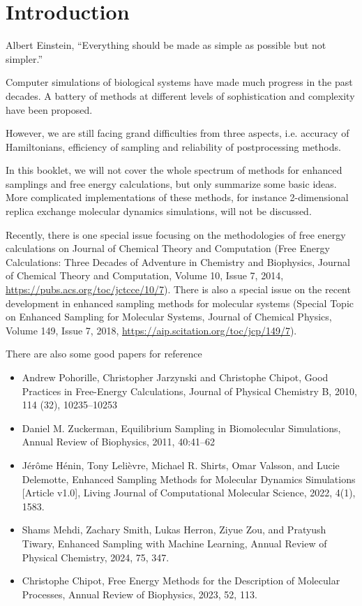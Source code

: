 \chapter{Introduction\label{chapter:introduction}}

\begin{chapquote}{Albert Einstein, %
	}
``Everything should be made as simple as possible but not simpler.''
\end{chapquote}

Computer simulations of biological systems have made much progress in the past decades. A battery of methods at different levels of sophistication and complexity have been proposed.

However, we are still facing grand difficulties from three aspects, i.e. accuracy of Hamiltonians, efficiency of sampling and reliability of postprocessing methods.\cite{NielsJCTC2014}

In this booklet, we will not cover the whole spectrum of methods for enhanced samplings and free energy calculations, but only summarize some basic ideas. 
More complicated implementations of these methods, for instance 2-dimensional replica exchange molecular dynamics simulations, will not be discussed.

Recently, there is one special issue focusing on the methodologies of free energy calculations on Journal of Chemical Theory and Computation (Free Energy Calculations: Three Decades of Adventure in Chemistry and Biophysics, Journal of Chemical Theory and Computation, Volume 10, Issue 7, 2014, \url{https://pubs.acs.org/toc/jctcce/10/7}). There is also a special issue on the recent development in enhanced sampling methods for molecular systems (Special Topic on Enhanced Sampling for Molecular Systems, Journal of Chemical Physics, Volume 149, Issue 7, 2018, \url{https://aip.scitation.org/toc/jcp/149/7}). 

There are also some good papers for reference
\begin{itemize}
	\item Andrew Pohorille, Christopher Jarzynski and Christophe Chipot, Good Practices in Free-Energy Calculations, Journal of Physical Chemistry B, 2010, 114 (32), 10235–10253
	\item Daniel M. Zuckerman, Equilibrium Sampling in Biomolecular Simulations, Annual Review of Biophysics, 2011, 40:41–62
	\item Jérôme Hénin, Tony Lelièvre, Michael R. Shirts, Omar Valsson, and Lucie Delemotte, Enhanced Sampling Methods for Molecular Dynamics Simulations [Article v1.0], Living Journal of Computational Molecular Science, 2022, 4(1), 1583.
	\item Shams Mehdi, Zachary Smith, Lukas Herron, Ziyue Zou, and Pratyush Tiwary, Enhanced Sampling with Machine Learning, Annual Review of Physical Chemistry, 2024, 75, 347.
	\item Christophe Chipot, Free Energy Methods for the Description of Molecular Processes, Annual Review of Biophysics, 2023, 52, 113.
\end{itemize}


